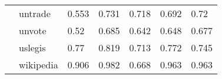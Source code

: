 \begin{tabular}{lllllll}
             & untrade &          0.553 &                 0.731 &                     0.718 &         0.692 &                     0.72 \\
             & unvote &           0.52 &                 0.685 &                     0.642 &         0.648 &                    0.677 \\
             & uslegis &           0.77 &                 0.819 &                     0.713 &         0.772 &                    0.745 \\
             & wikipedia &          0.906 &                 0.982 &                     0.668 &         0.963 &                    0.963 \\
\bottomrule
\end{tabular}